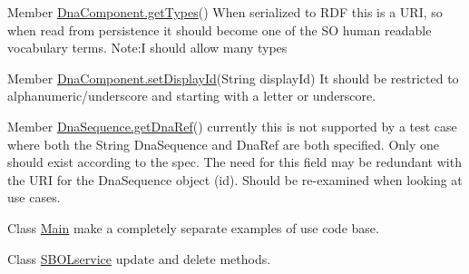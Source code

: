 \label{todo__todo000002}
\hypertarget{todo__todo000002}{}
 
\begin{DoxyDescription}
\item[Member \hyperlink{classorg_1_1sbolstandard_1_1lib_s_b_o_lj_1_1_dna_component_a518b97368db3de477d5fb57150d8b711}{DnaComponent.getTypes}() ]When serialized to RDF this is a URI, so when read from persistence it should become one of the SO human readable vocabulary terms. Note:I should allow many types 
\end{DoxyDescription}

\label{todo__todo000001}
\hypertarget{todo__todo000001}{}
 
\begin{DoxyDescription}
\item[Member \hyperlink{classorg_1_1sbolstandard_1_1lib_s_b_o_lj_1_1_dna_component_a46b93a70e7bd612a7b429aac4829bc88}{DnaComponent.setDisplayId}(String displayId) ]It should be restricted to alphanumeric/underscore and starting with a letter or underscore. 
\end{DoxyDescription}

\label{todo__todo000003}
\hypertarget{todo__todo000003}{}
 
\begin{DoxyDescription}
\item[Member \hyperlink{classorg_1_1sbolstandard_1_1lib_s_b_o_lj_1_1_dna_sequence_aa65410fe45bf6277117ef6a880e6ddce}{DnaSequence.getDnaRef}() ]currently this is not supported by a test case where both the String DnaSequence and DnaRef are both specified. Only one should exist according to the spec. The need for this field may be redundant with the URI for the DnaSequence object (id). Should be re-\/examined when looking at use cases. 
\end{DoxyDescription}

\label{todo__todo000012}
\hypertarget{todo__todo000012}{}
 
\begin{DoxyDescription}
\item[Class \hyperlink{classlib_s_b_o_lj_use_example_1_1_main}{Main} ]make a completely separate examples of use code base.
\end{DoxyDescription}

\label{todo__todo000004}
\hypertarget{todo__todo000004}{}
 
\begin{DoxyDescription}
\item[Class \hyperlink{classorg_1_1sbolstandard_1_1lib_s_b_o_lj_1_1_s_b_o_lservice}{SBOLservice} ]update and delete methods.
\end{DoxyDescription}

